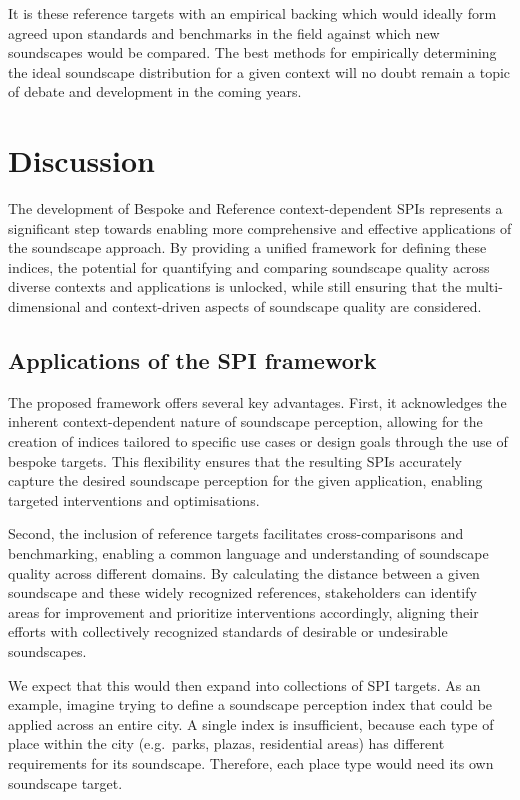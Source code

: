 \documentclass[
  authoryear,
  preprint,
  1p]{elsarticle}
\begin{document}
It is these reference targets with an empirical backing which would
ideally form agreed upon standards and benchmarks in the field against
which new soundscapes would be compared. The best methods for
empirically determining the ideal soundscape distribution for a given
context will no doubt remain a topic of debate and development in the
coming years.

\section{Discussion}\label{sec-discussion}

The development of Bespoke and Reference context-dependent SPIs
represents a significant step towards enabling more comprehensive and
effective applications of the soundscape approach. By providing a
unified framework for defining these indices, the potential for
quantifying and comparing soundscape quality across diverse contexts and
applications is unlocked, while still ensuring that the
multi-dimensional and context-driven aspects of soundscape quality are
considered.

\subsection{Applications of the SPI
framework}\label{applications-of-the-spi-framework}

The proposed framework offers several key advantages. First, it
acknowledges the inherent context-dependent nature of soundscape
perception, allowing for the creation of indices tailored to specific
use cases or design goals through the use of bespoke targets. This
flexibility ensures that the resulting SPIs accurately capture the
desired soundscape perception for the given application, enabling
targeted interventions and optimisations.

Second, the inclusion of reference targets facilitates cross-comparisons
and benchmarking, enabling a common language and understanding of
soundscape quality across different domains. By calculating the distance
between a given soundscape and these widely recognized references,
stakeholders can identify areas for improvement and prioritize
interventions accordingly, aligning their efforts with collectively
recognized standards of desirable or undesirable soundscapes.

We expect that this would then expand into collections of SPI targets.
As an example, imagine trying to define a soundscape perception index
that could be applied across an entire city. A single index is
insufficient, because each type of place within the city (e.g.~parks,
plazas, residential areas) has different requirements for its
soundscape. Therefore, each place type would need its own soundscape
target.
\end{document}
